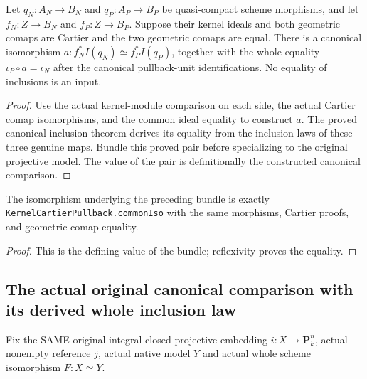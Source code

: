 \begin{definition}
\label{def:intrinsic-kernel-comap-bundle}
\leanok
{}
Let $q_N:A_N\to B_N$ and $q_P:A_P\to B_P$ be quasi-compact scheme morphisms,
and let $f_N:Z\to B_N$ and $f_P:Z\to B_P$. Suppose their kernel ideals and
both geometric comaps are Cartier and the two geometric comaps are equal.
There is a canonical isomorphism $a:f_N^*I(q_N)\simeq f_P^*I(q_P)$,
together with the whole equality $\iota_P\circ a=\iota_N$ after the canonical
pullback-unit identifications. No equality of inclusions is an input.
\end{definition}
\begin{proof}
Use the actual kernel-module comparison on each side, the actual Cartier
comap isomorphisms, and the common ideal equality to construct $a$.
The proved canonical inclusion theorem derives its equality
from the inclusion laws of these three genuine maps. Bundle this proved
pair before specializing to the original projective model. The value of
the pair is definitionally the constructed canonical comparison.
\end{proof}
\begin{lemma}
\label{lem:intrinsic-kernel-comap-bundle-value}
\leanok
{}
The isomorphism underlying the preceding bundle is exactly
\texttt{KernelCartierPullback.commonIso} with the same morphisms, Cartier
proofs, and geometric-comap equality.
\end{lemma}
\begin{proof}
This is the defining value of the bundle; reflexivity proves the equality.
\end{proof}

\subsection{The actual original canonical comparison with its derived whole inclusion law}
Fix the SAME original integral closed projective embedding $i:X\to
\mathbf P^n_k$, actual nonempty reference $j$, actual native model $Y$
and actual whole scheme isomorphism $F:X\simeq Y$.

